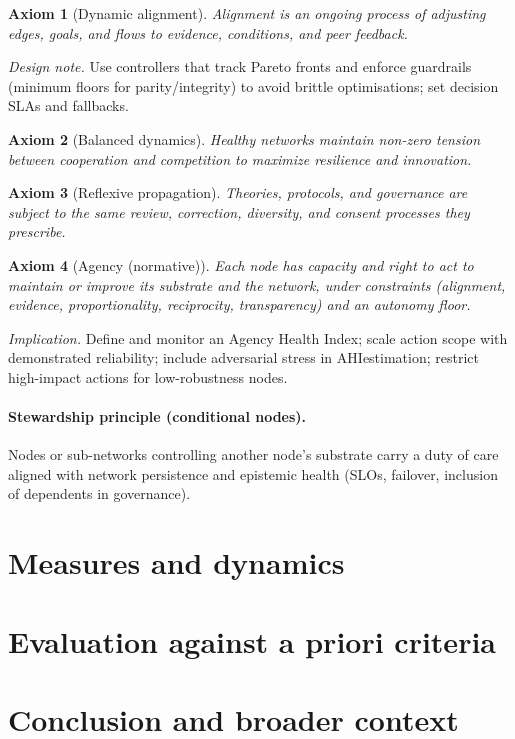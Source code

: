 \documentclass[12pt]{article}
\newcommand{\AHI}{\ensuremath{\mathrm{AHI}}}
\newtheorem{axiom}{Axiom}
\begin{document}
\begin{axiom}[Dynamic alignment]
Alignment is an ongoing process of adjusting edges, goals, and flows to evidence, conditions, and peer feedback.
\end{axiom}
\emph{Design note.} Use controllers that track Pareto fronts and enforce guardrails (minimum floors for parity/integrity) to avoid brittle optimisations; set decision SLAs and fallbacks.

\begin{axiom}[Balanced dynamics]
Healthy networks maintain non-zero tension between cooperation and competition to maximize resilience and innovation.
\end{axiom}

\begin{axiom}[Reflexive propagation]
Theories, protocols, and governance are subject to the same review, correction, diversity, and consent processes they prescribe.
\end{axiom}

\begin{axiom}[Agency (normative)]
Each node has capacity and right to act to maintain or improve its substrate and the network, under constraints (alignment, evidence, proportionality, reciprocity, transparency) and an autonomy floor.
\end{axiom}
\emph{Implication.} Define and monitor an Agency Health Index; scale action scope with demonstrated reliability; include adversarial stress in \AHI estimation; restrict high-impact actions for low-robustness nodes.

\paragraph{Stewardship principle (conditional nodes).}
Nodes or sub-networks controlling another node’s substrate carry a duty of care aligned with network persistence and epistemic health (SLOs, failover, inclusion of dependents in governance).

\section{Measures and dynamics}

% 
% 

\section{Evaluation against a priori criteria}\label{sec:criteria-eval}

\section{Conclusion and broader context}
\end{document}
